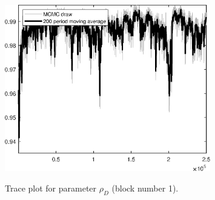 \begin{figure}[H]
\centering
  \includegraphics[width=0.8\textwidth]{BRS_growth_ext_fd_v1/graphs/TracePlot_rho_D_blck_1}\\
    \caption{Trace plot for parameter ${\rho_D}$ (block number 1).}
\end{figure}
